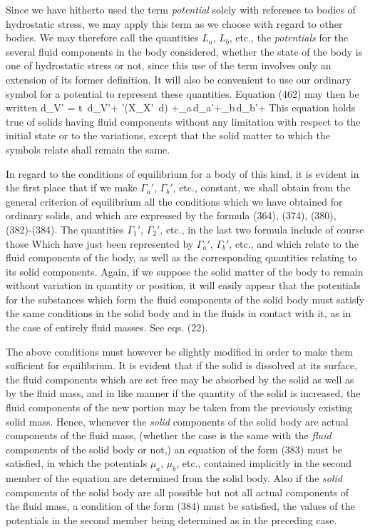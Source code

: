 \documentclass[12pt]{memoir}
\begin{document}
{Since we have hitherto used the term \textit{potential} solely with reference to bodies of hydrostatic stress, we may apply this term as we choose with regard to other bodies. We may therefore call the quantities $L_a$, $L_b$, etc., the \textit{potentials} for the several fluid components in the body considered, whether the state of the body is one of hydrostatic stress or not, since this use of the term involves only an extension of its former definition. It will also be convenient to use our ordinary symbol for a potential to represent these quantities. Equation (462) may then be written
\eqs d\epsilon_{V'} = t \,d\eta_{V'}+  \sum\sum\nolimits'\left(X_{X'} \,d\right) +\mu_a\,d\Gamma_a'+\mu_b\,d\Gamma_b'+     \label{468}\eqe
This equation holds true of solids having fluid components without any limitation with respect to the initial state or to the variations, except that the solid matter to which the symbols relate shall remain the same.


In regard to the conditions of equilibrium for a body of this kind, it is evident in the first place that if we make $\Gamma_a'$, $\Gamma_b'$, etc., constant, we shall obtain from the general criterion of equilibrium all the conditions which we have obtained for ordinary solids, and which are expressed by the formula (364), (374), (380), (382)-(384). The quantities $\Gamma_1'$, $\Gamma_2'$, etc., in the last two formula include of course those Which have just been represented by $\Gamma_a'$, $\Gamma_b'$, etc., and which relate to the fluid components of the body, as well as the corresponding quantities relating to its solid components. Again, if we suppose the solid matter of the body to remain without variation in quantity or position, it will easily appear that the potentials for the substances which form the fluid components of the solid body must satisfy the same conditions in the solid body and in the fluids in contact with it, as in the case of entirely fluid masses. See eqs. (22).


The above conditions must however be slightly modified in order to make them sufficient for equilibrium. It is evident that if the solid is dissolved at its surface, the fluid components which are set free may be absorbed by the solid as well as by the fluid mass, and in like manner if the quantity of the solid is increased, the fluid components of the new portion may be taken from the previously existing solid mass. Hence, whenever the \textit{solid} components of the solid body are actual components of the fluid mass, (whether the case is the same with the \textit{fluid} components of the solid body or not,) an equation of the form (383) must be satisfied, in which the potentials $\mu_a$, $\mu_b$, etc., contained implicitly in the second member of the equation are determined from the solid body. Also if the \textit{solid} components of the solid body are all possible but not all actual components of the fluid mass, a condition of the form (384) must be satisfied, the values of the potentials in the second member being determined as in the preceding case.


}
\end{document}
